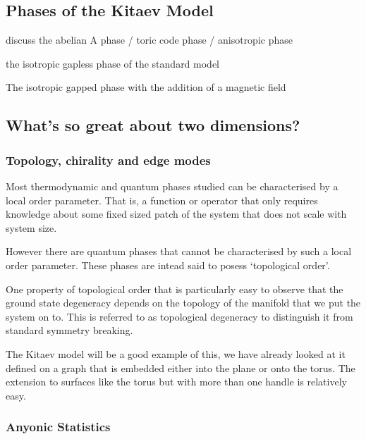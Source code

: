 \hypertarget{phases-of-the-kitaev-model}{%
\subsection{Phases of the Kitaev
Model}\label{phases-of-the-kitaev-model}}

discuss the abelian A phase / toric code phase / anisotropic phase

the isotropic gapless phase of the standard model

The isotropic gapped phase with the addition of a magnetic field

\hypertarget{whats-so-great-about-two-dimensions}{%
\subsection{What's so great about two
dimensions?}\label{whats-so-great-about-two-dimensions}}

\hypertarget{topology-chirality-and-edge-modes}{%
\subsubsection{Topology, chirality and edge
modes}\label{topology-chirality-and-edge-modes}}

Most thermodynamic and quantum phases studied can be characterised by a
local order parameter. That is, a function or operator that only
requires knowledge about some fixed sized patch of the system that does
not scale with system size.

However there are quantum phases that cannot be characterised by such a
local order parameter. These phases are intead said to posess
`topological order'.

One property of topological order that is particularly easy to observe
that the ground state degeneracy depends on the topology of the manifold
that we put the system on to. This is referred to as topological
degeneracy to distinguish it from standard symmetry breaking.

The Kitaev model will be a good example of this, we have already looked
at it defined on a graph that is embedded either into the plane or onto
the torus. The extension to surfaces like the torus but with more than
one handle is relatively easy.

\hypertarget{anyonic-statistics}{%
\subsubsection{Anyonic Statistics}\label{anyonic-statistics}}

